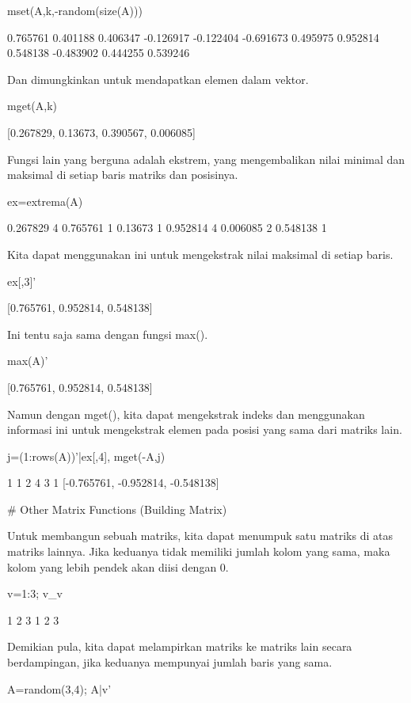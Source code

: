 \documentclass{article}
\begin{document}
\>mset(A,k,-random(size(A)))


         0.765761      0.401188      0.406347     -0.126917 
        -0.122404     -0.691673      0.495975      0.952814 
         0.548138     -0.483902      0.444255      0.539246 

Dan dimungkinkan untuk mendapatkan elemen dalam vektor.


\>mget(A,k)


    [0.267829,  0.13673,  0.390567,  0.006085]

Fungsi lain yang berguna adalah ekstrem, yang mengembalikan nilai
minimal dan maksimal di setiap baris matriks dan posisinya.


\>ex=extrema(A)


         0.267829             4      0.765761             1 
          0.13673             1      0.952814             4 
         0.006085             2      0.548138             1 

Kita dapat menggunakan ini untuk mengekstrak nilai maksimal di setiap
baris.


\>ex[,3]'


    [0.765761,  0.952814,  0.548138]

Ini tentu saja sama dengan fungsi max().


\>max(A)'


    [0.765761,  0.952814,  0.548138]

Namun dengan mget(), kita dapat mengekstrak indeks dan menggunakan
informasi ini untuk mengekstrak elemen pada posisi yang sama dari
matriks lain.


\>j=(1:rows(A))'|ex[,4], mget(-A,j)


                1             1 
                2             4 
                3             1 
    [-0.765761,  -0.952814,  -0.548138]

# Other Matrix Functions (Building Matrix)

Untuk membangun sebuah matriks, kita dapat menumpuk satu matriks di
atas matriks lainnya. Jika keduanya tidak memiliki jumlah kolom yang
sama, maka kolom yang lebih pendek akan diisi dengan 0.


\>v=1:3; v\_v


                1             2             3 
                1             2             3 

Demikian pula, kita dapat melampirkan matriks ke matriks lain secara
berdampingan, jika keduanya mempunyai jumlah baris yang sama.


\>A=random(3,4); A|v'
\end{document}
